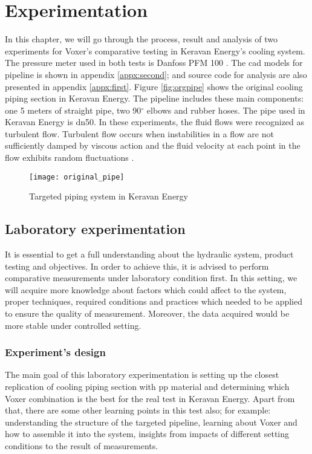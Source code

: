 
\chapter{Experimentation}

In this chapter, we will go through the process, result and analysis of two experiments for Voxer's comparative testing in Keravan Energy's cooling system. The pressure meter used in both tests is Danfoss PFM 100 \cite{danfoss:web}. The \gls{cad} models for pipeline is shown in appendix \ref{appx:second}; and source code for analysis are also presented in appendix \ref{appx:first}. Figure \vref{fig:orgpipe} shows the original cooling piping section in Keravan Energy. The pipeline includes these main components: one 5 meters of straight pipe, two 90$^{\circ}$ elbows and rubber hoses. The pipe used in Keravan Energy is \gls{dn}50. In these experiments, the fluid flows were recognized as turbulent flow. Turbulent flow occurs when instabilities in a flow are not sufficiently damped by viscous action and the fluid velocity at each point in the flow exhibits random fluctuations \cite{turbulent:article}.

\begin{figure}[h]
  \centering
  \texttt{[image: original\_pipe]}
  \caption{ Targeted piping system in Keravan Energy}
  \label{fig:orgpipe}
\end{figure}

\section{Laboratory experimentation}

It is essential to get a full understanding about the hydraulic system, product testing and objectives. In order to achieve this, it is advised to perform comparative measurements under laboratory condition first. In this setting, we will acquire more knowledge about factors which could affect to the system, proper techniques, required conditions and practices which needed to be applied to ensure the quality of measurement. Moreover, the data acquired would be more stable under controlled setting.

\subsection{Experiment's design}

The main goal of this laboratory experimentation is setting up the closest replication of cooling piping section with \gls{pp} material and determining which Voxer combination is the best for the real test in Keravan Energy. Apart from that, there are some other learning points in this test also; for example: understanding the structure of the targeted pipeline, learning about Voxer and how to assemble it into the system, insights from impacts of different setting conditions to the result of measurements.


